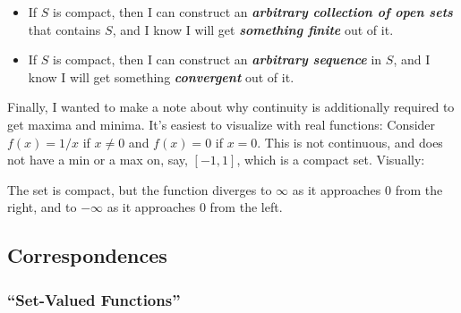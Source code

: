 \documentclass{article}
\begin{document}
\begin{itemize}[label=$\bullet$]
  \item If $S$ is compact, then I can construct an \textbf{\textit{arbitrary collection of open sets}} that contains $S$, and I know I will get \textbf{\textit{something finite}} out of it.

  \item If $S$ is compact, then I can construct an \textbf{\textit{arbitrary sequence}} in $S$, and I know I will get something \textbf{\textit{convergent}} out of it.
\end{itemize}

Finally, I wanted to make a note about why continuity is additionally required to get maxima and minima. It's easiest to visualize with real functions: Consider $f(x) = 1/x$ if $x \ne 0$ and $f(x) = 0$ if  $x = 0$. This is not continuous, and does not have a min or a max on, say, $[-1, 1]$, which is a compact set. Visually:
\begin{figure}[H]
  \centering
\end{figure}

The set is compact, but the function diverges to $\infty$ as it approaches $0$ from the right, and to $-\infty$ as it approaches $0$ from the left.

\subsection{Correspondences}
\label{sub:correspondences}

\subsubsection{``Set-Valued Functions''}
\label{ssub:_set_valued_functions_}
\end{document}

